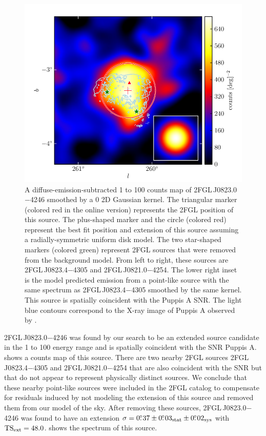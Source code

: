 \begin{figure}[htbp]
  \includegraphics{source_plots/source_Puppis_A_color.pdf}
  \caption{A diffuse-emission-subtracted 1 \gev to 100 \gev counts
  map of 2FGL\,J0823.0$-$4246 smoothed by a 0 2D Gaussian kernel.
  The triangular marker (colored red in the online version) represents the
  2FGL position of this source.  The plus-shaped marker and the circle
  (colored red) represent the best fit position and extension of this
  source assuming a radially-symmetric uniform disk model.  The two
  star-shaped markers (colored green) represent 2FGL sources that were
  removed from the background model.  From left to right, these sources
  are 2FGL\,J0823.4$-$4305 and 2FGL\,J0821.0$-$4254.  The lower right
  inset is the model predicted emission from a point-like source with
  the same spectrum as 2FGL\,J0823.4$-$4305 smoothed by the same kernel.
  This source is spatially coincident with the Puppis A SNR. The light
  blue contours correspond to the X-ray image of Puppis A observed by
  \rosat \citep{petre_1996a_central-stellar}.}
\end{figure}

2FGL\,J0823.0$-$4246 was found by our search to be an extended source
candidate in the 1 \gev to 100 \gev energy range and is spatially
coincident with the SNR Puppis A.  
shows a counts map of this source. There are two nearby 2FGL sources
2FGL\,J0823.4$-$4305 and 2FGL\,J0821.0$-$4254 that are also coincident
with the SNR but that do not appear to represent physically distinct
sources.  We conclude that these nearby point-like sources were included
in the 2FGL catalog to compensate for residuals induced by not modeling
the extension of this source and removed them from our model of the sky.
After removing these sources, 2FGL\,J0823.0$-$4246 was found to have
an extension $\sigma=0\mbox{$.\!\!^\circ$}37\pm0\mbox{$.\!\!^\circ$}03_\text{stat}\pm0\mbox{$.\!\!^\circ$}02_\text{sys}$ with
$\mathrm{TS}_\mathrm{ext}=48.0$.   shows the spectrum of this source.


